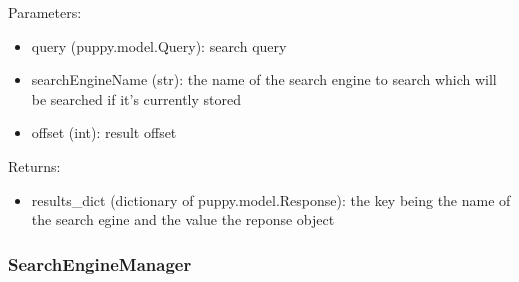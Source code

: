 \documentclass[letterpaper,10pt,english]{sphinxmanual}
\begin{document}
\begin{fulllineitems}
\begin{fulllineitems}
Parameters:
\begin{itemize}
\item {} 
query (puppy.model.Query): search query

\item {} 
searchEngineName (str): the name of the search engine to search which will be searched if it's currently stored

\item {} 
offset (int): result offset

\end{itemize}

Returns:
\begin{itemize}
\item {} 
results\_dict (dictionary of puppy.model.Response): the key being the name of the search egine and the value the reponse object

\end{itemize}

\end{fulllineitems}


\end{fulllineitems}



\subsubsection{SearchEngineManager}
\label{api2.0:searchenginemanager}
\end{document}
